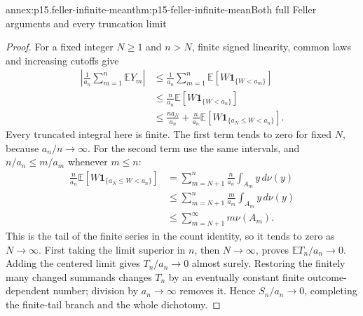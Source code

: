 \begin{annexitem}{annex:p15.feller-infinite-mean}{thm:p15-feller-infinite-mean}{Both full Feller arguments and every truncation limit}
\begin{proof}
For a fixed integer \(N\geq1\) and \(n>N\), finite signed
linearity, common laws and increasing cutoffs give
\[
 \begin{aligned}
 \left|\frac1{a_n}\sum_{m=1}^n\mathbb EY_m\right|
 &\leq\frac1{a_n}\sum_{m=1}^n
                  \mathbb E[W\mathbf1_{\{W<a_m\}}]\\
 &\leq\frac{n}{a_n}\mathbb E[W\mathbf1_{\{W<a_n\}}]\\
 &\leq\frac{n a_N}{a_n}
       +\frac{n}{a_n}\mathbb E[W\mathbf1_{\{a_N\leq W<a_n\}}].
 \end{aligned}
\]
Every truncated integral here is finite. The first term tends to
zero for fixed \(N\), because \(a_n/n\to\infty\).
For the second term use the same intervals, and
\(n/a_n\leq m/a_m\) whenever \(m\leq n\):
\[
 \begin{aligned}
 \frac{n}{a_n}\mathbb E[W\mathbf1_{\{a_N\leq W<a_n\}}]
 &=\sum_{m=N+1}^n\frac{n}{a_n}\int_{A_m}y\,d\nu(y)\\
 &\leq\sum_{m=N+1}^n\frac{m}{a_m}\int_{A_m}y\,d\nu(y)\\
 &\leq\sum_{m=N+1}^\infty m\nu(A_m).
 \end{aligned}
\]
This is the tail of the finite series in the count identity, so it
tends to zero as \(N\to\infty\). First taking the limit superior
in \(n\), then \(N\to\infty\), proves \(\mathbb ET_n/a_n\to0\).
Adding the centered limit gives \(T_n/a_n\to0\) almost surely.
Restoring the finitely many changed summands changes \(T_n\) by
an eventually constant finite outcome-dependent number; division
by \(a_n\to\infty\) removes it. Hence \(S_n/a_n\to0\), completing
the finite-tail branch and the whole dichotomy.
\end{proof}
\end{annexitem}

